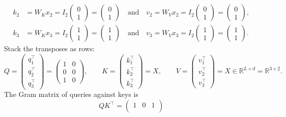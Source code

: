 \documentclass[11pt,a4paper]{article}
\theoremstyle{definition}
\begin{document}
\begin{example}
\begin{align*}
\\
k_2
&=W_K x_2
=I_2\begin{pmatrix}0\\1\end{pmatrix}
=\begin{pmatrix}0\\1\end{pmatrix}
\quad\text{and}\quad
v_2
=W_V x_2
=I_2\begin{pmatrix}0\\1\end{pmatrix}
=\begin{pmatrix}0\\1\end{pmatrix},
\\
k_3
&=W_K x_3
=I_2\begin{pmatrix}1\\1\end{pmatrix}
=\begin{pmatrix}1\\1\end{pmatrix}
\quad\text{and}\quad
v_3
=W_V x_3
=I_2\begin{pmatrix}1\\1\end{pmatrix}
=\begin{pmatrix}1\\1\end{pmatrix}.
\end{align*}
Stack the transposes as rows:
\[
Q
=\begin{pmatrix}q_1^\top\\q_2^\top\\q_3^\top\end{pmatrix}
=\begin{pmatrix}1&0\\0&0\\1&0\end{pmatrix},\qquad
K
=\begin{pmatrix}k_1^\top\\k_2^\top\\k_3^\top\end{pmatrix}
=X,\qquad
V
=\begin{pmatrix}v_1^\top\\v_2^\top\\v_3^\top\end{pmatrix}
=X
\in\mathbb{R}^{L\times d}=\mathbb{R}^{3\times 2}.
\]
The Gram matrix of queries against keys is
\[
QK^\top
=\begin{pmatrix}
1&0&1\\

\end{pmatrix}\]
\end{example}
\end{document}
